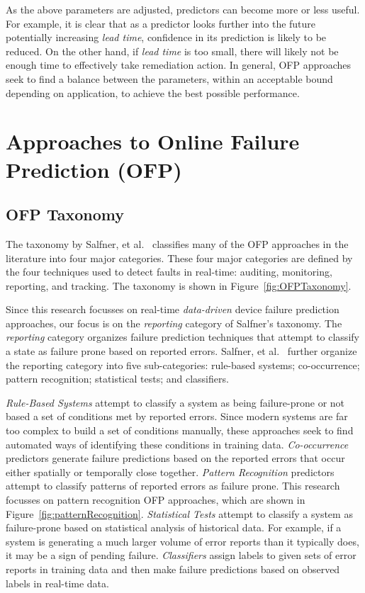 As the above parameters are adjusted, predictors can become more or less
useful.  For example, it is clear that as a predictor looks further into the
future potentially increasing \emph{lead time}, confidence in its prediction is
likely to be reduced.  On the other hand, if \emph{lead time} is too small,
there will likely not be enough time to effectively take remediation action.
In general, OFP approaches seek to find a balance between the parameters,
within an acceptable bound depending on application, to achieve the best
possible performance.

\section{Approaches to Online Failure Prediction (OFP)} \label{approaches}
\subsection{OFP Taxonomy}
The taxonomy by Salfner, et al.~\cite{salfnerSurvey} classifies many of the OFP
approaches in the literature into four major categories.  These four major
categories are defined by the four techniques used to detect faults in
real-time: auditing, monitoring, reporting, and tracking.  The taxonomy is
shown in Figure~\ref{fig:OFPTaxonomy}.


Since this research focusses on real-time \emph{data-driven} device failure
prediction approaches, our focus is on the \emph{reporting} category of
Salfner's taxonomy.  The \emph{reporting} category organizes failure prediction
techniques that attempt to classify a state as failure prone based on reported
errors.  Salfner, et al.~\cite{salfnerSurvey} further organize the reporting
category into five sub-categories: rule-based systems; co-occurrence; pattern
recognition; statistical tests; and classifiers.

\emph{Rule-Based Systems} attempt to classify a system as being failure-prone
or not based a set of conditions met by reported errors.  Since modern systems
are far too complex to build a set of conditions manually, these approaches
seek to find automated ways of identifying these conditions in training data.
\emph{Co-occurrence} predictors generate failure predictions based on the
reported errors that occur either spatially or temporally close together.
\emph{Pattern Recognition} predictors attempt to classify patterns of reported
errors as failure prone.  This research focusses on pattern recognition OFP
approaches, which are shown in Figure~\ref{fig:patternRecognition}.
\emph{Statistical Tests} attempt to classify a system as failure-prone based on
statistical analysis of historical data.  For example, if a system is
generating a much larger volume of error reports than it typically does, it may
be a sign of pending failure.  \emph{Classifiers} assign labels to given sets
of error reports in training data and then make failure predictions based on
observed labels in real-time data.


